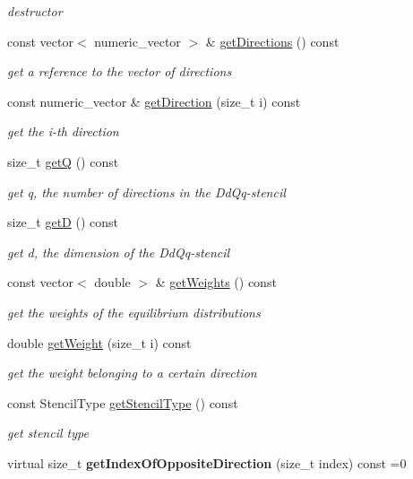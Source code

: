 \begin{DoxyCompactItemize}
\begin{DoxyCompactList}\small\item\em destructor \end{DoxyCompactList}\item 
const vector$<$ numeric\-\_\-vector $>$ \& \hyperlink{classnatrium_1_1BoltzmannModel_aeabed4142acd04a57ba41ca26dfbe666}{get\-Directions} () const 
\begin{DoxyCompactList}\small\item\em get a reference to the vector of directions \end{DoxyCompactList}\item 
const numeric\-\_\-vector \& \hyperlink{classnatrium_1_1BoltzmannModel_a0b258b2c7cc4cba5ac666a06ca2a8f49}{get\-Direction} (size\-\_\-t i) const 
\begin{DoxyCompactList}\small\item\em get the i-\/th direction \end{DoxyCompactList}\item 
size\-\_\-t \hyperlink{classnatrium_1_1BoltzmannModel_ae7cfcd108a085d3215cdc8c00e826107}{get\-Q} () const 
\begin{DoxyCompactList}\small\item\em get q, the number of directions in the Dd\-Qq-\/stencil \end{DoxyCompactList}\item 
size\-\_\-t \hyperlink{classnatrium_1_1BoltzmannModel_a8d16745a0dab65cb0324d6b076e53d15}{get\-D} () const 
\begin{DoxyCompactList}\small\item\em get d, the dimension of the Dd\-Qq-\/stencil \end{DoxyCompactList}\item 
const vector$<$ double $>$ \& \hyperlink{classnatrium_1_1BoltzmannModel_a75e9d0e42b1ceac9319e90571c4890fb}{get\-Weights} () const 
\begin{DoxyCompactList}\small\item\em get the weights of the equilibrium distributions \end{DoxyCompactList}\item 
double \hyperlink{classnatrium_1_1BoltzmannModel_af03568f87e11d77ebbb4ed37ab708647}{get\-Weight} (size\-\_\-t i) const 
\begin{DoxyCompactList}\small\item\em get the weight belonging to a certain direction \end{DoxyCompactList}\item 
const Stencil\-Type \hyperlink{classnatrium_1_1BoltzmannModel_ac95c2547a37e380d8d7b3de3c0f8a4c2}{get\-Stencil\-Type} () const 
\begin{DoxyCompactList}\small\item\em get stencil type \end{DoxyCompactList}\item 
\hypertarget{classnatrium_1_1BoltzmannModel_a55c61f122a1ec368119fc8e89ef1ee3b}{virtual size\-\_\-t {\bfseries get\-Index\-Of\-Opposite\-Direction} (size\-\_\-t index) const =0}\label{classnatrium_1_1BoltzmannModel_a55c61f122a1ec368119fc8e89ef1ee3b}


\end{DoxyCompactItemize}
